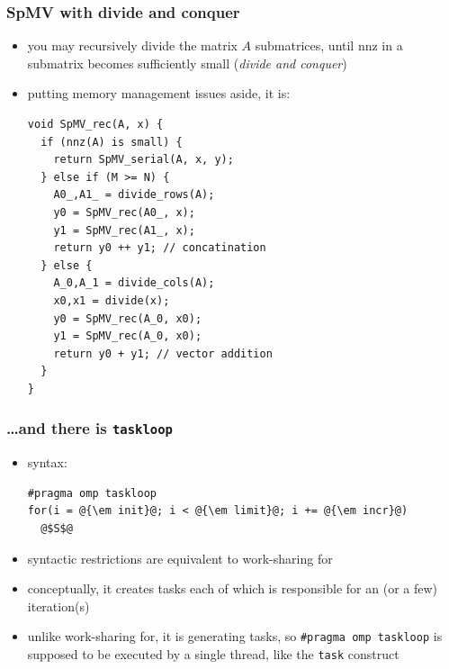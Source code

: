 \documentclass[12pt,dvipdfmx]{beamer}
\begin{document}
\begin{frame}[fragile]
  \frametitle{SpMV with divide and conquer}
  \begin{itemize}
  \item 
    you may recursively divide the matrix $A$ submatrices, until
    nnz in a submatrix becomes sufficiently small ({\it divide and conquer})
  \item putting memory management issues aside, it is:
\begin{lstlisting}
void SpMV_rec(A, x) {
  if (nnz(A) is small) {
    return SpMV_serial(A, x, y);
  } else if (M >= N) {
    A0_,A1_ = divide_rows(A);
    y0 = SpMV_rec(A0_, x); 
    y1 = SpMV_rec(A1_, x); 
    return y0 ++ y1; // concatination
  } else {
    A_0,A_1 = divide_cols(A);
    x0,x1 = divide(x);
    y0 = SpMV_rec(A_0, x0); 
    y1 = SpMV_rec(A_0, x0); 
    return y0 + y1; // vector addition
  }
}
\end{lstlisting}
\end{itemize}
\end{frame}

\begin{frame}[fragile]
\frametitle{\ldots and there is {\tt taskloop}}

\begin{itemize}
\item syntax:
\begin{lstlisting}
#pragma omp taskloop
for(i = @{\em init}@; i < @{\em limit}@; i += @{\em incr}@) 
  @$S$@
\end{lstlisting}
\item syntactic restrictions are equivalent to work-sharing for
\item conceptually, it creates tasks each of which is
  responsible for an (or a few) iteration(s)
\item unlike work-sharing for, it is generating tasks, so
  {\tt \#pragma omp taskloop} is supposed to be executed by a single thread,
  like the {\tt task} construct
\end{itemize}
\end{frame}
\fi

\end{document}
